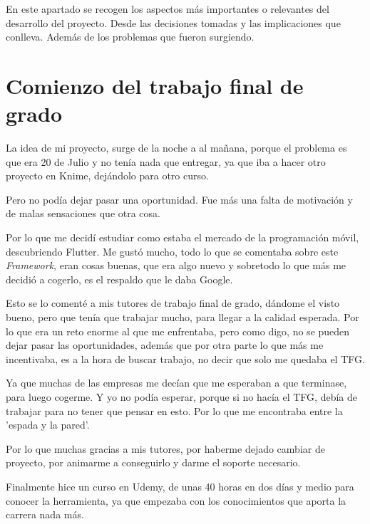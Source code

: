 
En este apartado se recogen los aspectos más importantes o relevantes del desarrollo del proyecto. Desde las decisiones tomadas y las implicaciones que conlleva. Además de los problemas que fueron surgiendo.

\section{Comienzo del trabajo final de grado}
La idea de mi proyecto, surge de la noche a al mañana, porque el problema es que era 20 de Julio y no tenía nada que entregar, ya que iba a hacer otro proyecto en Knime, dejándolo para otro curso. 

Pero no podía dejar pasar una oportunidad. Fue más una falta de motivación y de malas sensaciones que otra cosa.

Por lo que me decidí estudiar como estaba el mercado de la programación móvil, descubriendo Flutter. Me gustó mucho, todo lo que se comentaba sobre este \emph{Framework}, eran cosas buenas, que era algo nuevo y sobretodo lo que más me decidió a cogerlo, es el respaldo que le daba Google.

Esto se lo comenté a mis tutores de trabajo final de grado, dándome el visto bueno, pero que tenía que trabajar mucho, para llegar a la calidad esperada. Por lo que era un reto enorme al que me enfrentaba, pero como digo, no se pueden dejar pasar las oportunidades, además que por otra parte lo que más me incentivaba, es a la hora de buscar trabajo, no decir que solo me quedaba el TFG. 

Ya que muchas de las empresas me decían que me esperaban a que terminase, para luego cogerme. Y yo no podía esperar, porque si no hacía el TFG, debía de trabajar para no tener que pensar en esto. Por lo que me encontraba entre la 'espada y la pared'.

Por lo que muchas gracias a mis tutores, por haberme dejado cambiar de proyecto, por animarme a conseguirlo y darme el soporte necesario.

Finalmente hice un curso en Udemy, de unas 40 horas en dos días y medio para conocer la herramienta, ya que empezaba con los conocimientos que aporta la carrera nada más.